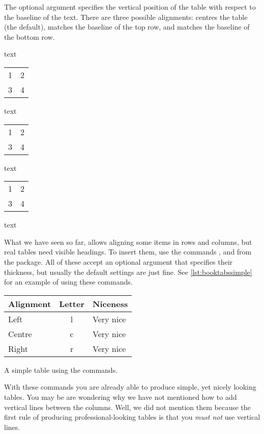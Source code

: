 The optional  argument specifies the vertical position of the table
with respect to the baseline of the text. There are three possible alignments:
 centres the table (the default),  matches the baseline of
the top row, and  matches the baseline of the bottom row.
\begin{example}[examplewidth=0.85\linewidth, vertical_mode]
text
\begin{tabular}{ll} 1 & 2 \\ 3 & 4 \\ \end{tabular}
text
\begin{tabular}[t]{ll} 1 & 2 \\ 3 & 4 \\ \end{tabular}
text
\begin{tabular}[b]{ll} 1 & 2 \\ 3 & 4 \\ \end{tabular}
text
\end{example}

What we have seen so far, allows aligning some items in rows and columns,
but real tables need visible headings. To insert them, use the commands
,  and  from the 
package.
All of these accept an optional argument that specifies their thickness, but
usually the default settings are just fine. See
\autoref{lst:booktabssimple} for an example of using these commands.
\begin{listing}
  \begin{example}[examplewidth=0.6\linewidth, vertical_mode]
\begin{tabular}{lcl}
  \toprule
  Alignment & Letter & Niceness  \\
  \midrule
  Left      & l      & Very nice \\
  Centre    & c      & Very nice \\
  Right     & r      & Very nice \\
  \bottomrule
\end{tabular}
\end{example}
  \caption{A simple table using the  commands.}\label{lst:booktabssimple}
\end{listing}

With these commands you are already able to produce simple, yet nicely looking
tables. You may be are wondering why we have not mentioned how to add vertical
lines between the columns. Well, we did not mention them because the first rule
of producing professional-looking tables is that you \emph{must not} use
vertical lines. %


